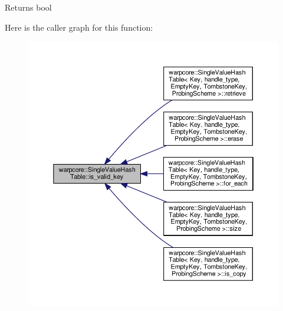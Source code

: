 \begin{DoxyReturn}{Returns}
{\ttfamily bool} 
\end{DoxyReturn}
Here is the caller graph for this function\+:
\nopagebreak
\begin{figure}[H]
\begin{center}
\leavevmode
\includegraphics[width=350pt]{classwarpcore_1_1SingleValueHashTable_a46cd1b240746021179983e3263f427b5_icgraph}
\end{center}
\end{figure}
\mbox{\label{classwarpcore_1_1SingleValueHashTable_ad16e25026a5ac0b064249d520299c086}} 
